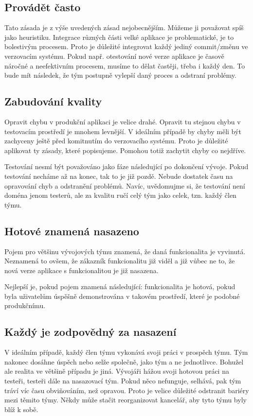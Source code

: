 \subsection{Provádět často}
Tato zásada je z výše uvedených zásad nejobecnějším. Můžeme ji považovat spíš jako heuristiku. Integrace různých části velké aplikace je problematické, je to bolestivým procesem. Proto je důležité integrovat každý jediný commit/změnu ve verzovacím systému. Pokud např. otestování nové verze aplikace je časově náročné a neefektivním procesem, musíme to dělat častěji, třeba i každý den. To bude mít následek, že tým postupně vylepší daný proces a odstraní problémy.

\subsection{Zabudování kvality}
Opravit chybu v produkční aplikaci je velice drahé. Opravit tu stejnou chybu v testovacím prostředí je mnohem levnější. V ideálním případě by chyby měli být zachyceny ještě před komitnutím do verzovacího systému. Proto je důležité aplikovat ty zásady, které popisujeme. Pomohou totiž zachytit chyby co nejdříve.

Testování nesmí být považováno jako fáze následující po dokončení vývoje. Pokud testování necháme až na konec, tak to je již pozdě. Nebude dostatek času na opravování chyb a odstranění problémů. Navíc, uvědomujme si, že testování není doména jenom testerů, ale za kvalitu ručí celý tým jako celek, tzn. každý člen týmu.

\subsection{Hotové znamená nasazeno}
Pojem  pro většinu vývojových týmu znamená, že daná funkcionalita je vyvinutá. Neznamená to ovšem, že zákazník funkcionalitu již viděl a již vůbec ne to, že nová verze aplikace s funkcionalitou je již nasazena. 

Nejlepší je, pokud pojem  znamená následující: funkcionalita je hotová, pokud byla uživatelům úspěšně demonstrována v takovém prostředí, které je podobné produkčnímu. 

\subsection{Každý je zodpovědný za nasazení}
V ideálním případě, každý člen týmu vykonává svoji práci v prospěch týmu. Tým nakonec dosáhne úspěch nebo selže společně, jako tým a ne jednotlivce. Bohužel ale realita ve většině případu je jiná. Vývojáři hážou svoji hotovou práci na testeři, testeři dále na nasazovací tým. Pokud něco nefunguje, selhává, pak tým tráví víc času obviňováním, než opravou. Proto je velice důležité odstranit bariéry mezi těmito týmy. Někdy může stačit reorganizovat kancelář, aby tyto týmu byly blíž k sobě.

